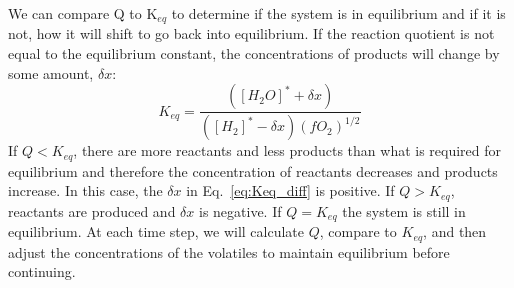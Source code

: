 We can compare Q to K$_{eq}$ to determine if the system is in equilibrium and if it is not, how it will shift to go back into equilibrium. If the reaction quotient is not equal to the equilibrium constant, the concentrations of products will change by some amount, $\delta x$:
\begin{equation}
K_{eq} = \frac{([H_2O]^\ast + \delta x)}{([H_2]^\ast - \delta x) (fO_2)^{1/2}}
\label{eq:Keq_diff}
\end{equation}
If $Q < K_{eq}$, there are more reactants and less products than what is required for equilibrium and therefore the concentration of reactants decreases and products increase. In this case, the $\delta x$ in Eq.~\ref{eq:Keq_diff} is positive. If $Q > K_{eq}$, reactants are produced and $\delta x$ is negative. If $Q = K_{eq}$ the system is still in equilibrium. At each time step, we will calculate $Q$, compare to $K_{eq}$, and then adjust the concentrations of the volatiles to maintain equilibrium before continuing.
